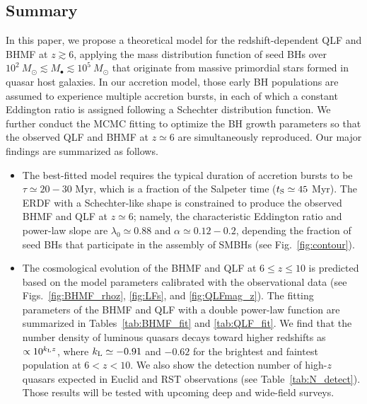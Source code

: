\documentclass[twocolumn, twocolappendix]{aastex63}
\newcommand{\Msun}{M_\odot}
\begin{document}
\begin{CJK*}{UTF8}{gbsn}
\section{Summary}
\label{sec:sum}
In this paper, we propose a theoretical model for the redshift-dependent QLF and BHMF at $z\gtrsim 6$,
applying the mass distribution function of seed BHs over $10^2~\Msun \lesssim M_\bullet \lesssim 10^5~\Msun$
that originate from massive primordial stars formed in quasar host galaxies.
In our accretion model, those early BH populations are assumed to experience multiple accretion bursts,
in each of which a constant Eddington ratio is assigned following a Schechter distribution function.
We further conduct the MCMC fitting to optimize the BH growth parameters
so that the observed QLF and BHMF at $z\simeq 6$ are simultaneously reproduced.
Our major findings are summarized as follows.


\begin{itemize}
\item
The best-fitted model requires the typical duration of accretion bursts to be $\tau \simeq 20-30$ Myr,
which is a fraction of the Salpeter time ($t_{\rm S} \simeq 45$ Myr).
The ERDF with a Schechter-like shape is constrained to produce the observed BHMF and QLF at $z\simeq 6$; namely,
the characteristic Eddington ratio and power-law slope are $\lambda_0 \simeq 0.88$ and $\alpha \simeq 0.12-0.2$,
depending the fraction of seed BHs that participate in the assembly of SMBHs (see Fig.~\ref{fig:contour}).

\item
The cosmological evolution of the BHMF and QLF at $6\leq z \leq 10$ is predicted based on the model parameters
calibrated with the observational data (see Figs.~\ref{fig:BHMF_rhoz}, \ref{fig:LFs}, and \ref{fig:QLFmag_z}).
The fitting parameters of the BHMF and QLF with a double power-law function are summarized in Tables~\ref{tab:BHMF_fit} and \ref{tab:QLF_fit}.
We find that the number density of luminous quasars decays toward higher redshifts as $\propto 10^{k_{\rm L} z}$,
where $k_{\rm L}\simeq -0.91$ and $-0.62$ for the brightest and faintest population at $6<z<10$.
We also show the detection number of high-$z$ quasars expected in Euclid and RST observations (see Table~\ref{tab:N_detect}).
Those results will be tested with upcoming deep and wide-field surveys.



\end{itemize}
\end{CJK*}
\end{document}
